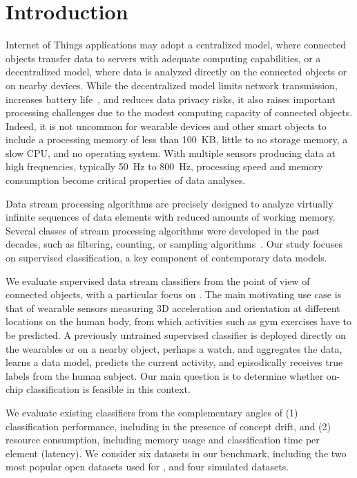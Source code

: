 \section{Introduction}
\label{sec:introduction}

Internet of Things applications may adopt a
centralized model, where connected objects transfer data to servers with 
adequate computing capabilities, or a decentralized model, where data is analyzed directly on the connected
objects or on nearby devices. While the decentralized model limits network transmission,
increases battery life~\cite{sensor-network-survey, sensor-energy-model},
and reduces data privacy risks, it also raises important processing challenges
due to the modest computing capacity of connected objects. Indeed, it is not uncommon for wearable devices and other smart objects
to include a processing memory of less than 100~KB, little to no storage
memory, a slow CPU, and no operating system. With multiple sensors
producing data at high frequencies, typically 50~Hz to 800~Hz, processing speed and
memory consumption become critical properties of data analyses. 

Data stream processing algorithms are precisely designed to analyze
virtually infinite sequences of data elements with reduced amounts of
working memory. Several classes of stream processing algorithms were
developed in the past decades, such as filtering, counting, or sampling
algorithms~\cite{kejariwal2015}.  Our study focuses on supervised
classification, a key component of contemporary data models.

We evaluate supervised data stream classifiers from
the point of view of connected objects, with a
particular focus on \har. The main motivating use case is that of wearable
sensors measuring 3D acceleration and orientation at different locations on
the human body, from which activities such as gym exercises have to be
predicted. A previously untrained supervised classifier is deployed directly on the wearables or on
a nearby object, perhaps a watch, and aggregates the data, learns a data model, predicts the current
activity, and episodically receives true labels from the human subject. Our
main question is to determine whether on-chip classification is feasible in
this context. 

We evaluate existing classifiers from the complementary angles of (1)
classification performance, including in the presence of concept drift, and
(2) resource consumption, including memory usage and classification time
per element (latency). We consider six datasets in our benchmark, including
the two most popular open datasets used for \har, and
four simulated datasets. 


